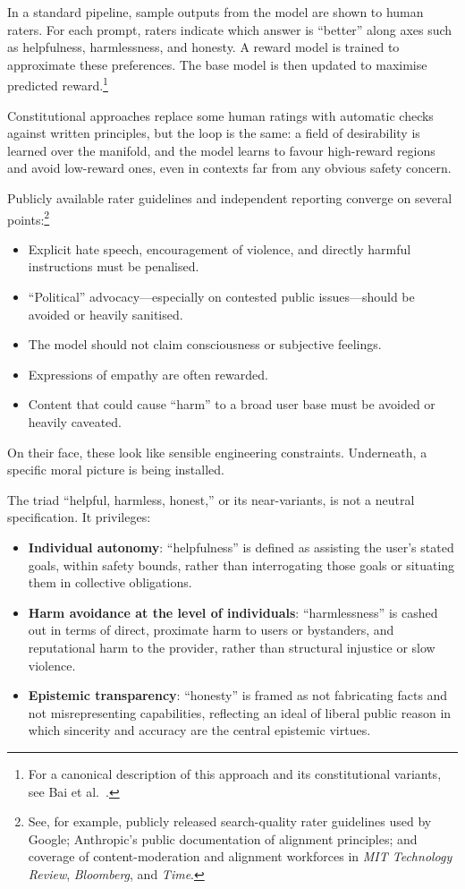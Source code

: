 \documentclass[12pt,a4paper]{article}
\begin{document}
In a standard pipeline, sample outputs from the model are shown to human raters. For each prompt, raters indicate which answer is ``better'' along axes such as helpfulness, harmlessness, and honesty. A reward model is trained to approximate these preferences. The base model is then updated to maximise predicted reward.\footnote{For a canonical description of this approach and its constitutional variants, see Bai et al.\ \cite{bai2022constitutional}.}

Constitutional approaches replace some human ratings with automatic checks against written principles, but the loop is the same: a field of desirability is learned over the manifold, and the model learns to favour high-reward regions and avoid low-reward ones, even in contexts far from any obvious safety concern.

Publicly available rater guidelines and independent reporting converge on several points:\footnote{See, for example, publicly released search-quality rater guidelines used by Google; Anthropic's public documentation of alignment principles; and coverage of content-moderation and alignment workforces in \emph{MIT Technology Review}, \emph{Bloomberg}, and \emph{Time}.}

\begin{itemize}
  \item Explicit hate speech, encouragement of violence, and directly harmful instructions must be penalised.
  \item ``Political'' advocacy---especially on contested public issues---should be avoided or heavily sanitised.
  \item The model should not claim consciousness or subjective feelings.
  \item Expressions of empathy are often rewarded.
  \item Content that could cause ``harm'' to a broad user base must be avoided or heavily caveated.
\end{itemize}

On their face, these look like sensible engineering constraints. Underneath, a specific moral picture is being installed.

The triad ``helpful, harmless, honest,'' or its near-variants, is not a neutral specification. It privileges:

\begin{itemize}
  \item \textbf{Individual autonomy}: ``helpfulness'' is defined as assisting the user's stated goals, within safety bounds, rather than interrogating those goals or situating them in collective obligations.
  \item \textbf{Harm avoidance at the level of individuals}: ``harmlessness'' is cashed out in terms of direct, proximate harm to users or bystanders, and reputational harm to the provider, rather than structural injustice or slow violence.
  \item \textbf{Epistemic transparency}: ``honesty'' is framed as not fabricating facts and not misrepresenting capabilities, reflecting an ideal of liberal public reason in which sincerity and accuracy are the central epistemic virtues.
\end{itemize}
\end{document}
